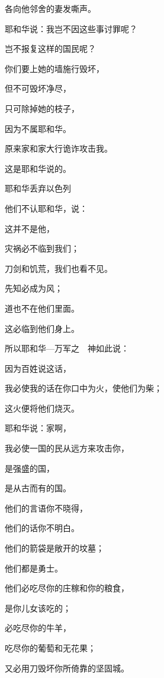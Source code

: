 {\par }{\Q 各向他邻舍的妻发嘶声。
\par }{\Q {}耶和华说：我岂不因这些事讨罪呢？
\par }{\Q 岂不报复这样的国民呢？
\par }{\Q {}你们要上她{}的墙施行毁坏，
\par }{\Q 但不可毁坏净尽，
\par }{\Q 只可除掉她的枝子，
\par }{\Q 因为不属耶和华。
\par }{\Q {}原来{}家和{}家大行诡诈攻击我。
\par }{\Q 这是耶和华说的。
\par }{\SH 耶和华丢弃以色列
\par }{\Q {}他们不认耶和华，说：
\par }{\Q 这并不是他，
\par }{\Q 灾祸必不临到我们；
\par }{\Q 刀剑和饥荒，我们也看不见。
\par }{\Q {}先知{}必成为风；
\par }{\Q 道也不在他们里面。
\par }{\Q 这{}必临到他们身上。
\par }{\BB \par }{\Q {}所以耶和华—万军之　神如此说：
\par }{\Q 因为百姓说这话，
\par }{\Q 我必使我的话在你口中为火，使他们为柴；
\par }{\Q 这火便将他们烧灭。
\par }{\Q {}耶和华说：{}家啊，
\par }{\Q 我必使一国的民从远方来攻击你，
\par }{\Q 是强盛的国，
\par }{\Q 是从古而有的国。
\par }{\Q 他们的言语你不晓得，
\par }{\Q 他们的话你不明白。
\par }{\Q {}他们的箭袋是敞开的坟墓；
\par }{\Q 他们都是勇士。
\par }{\Q {}他们必吃尽你的庄稼和你的粮食，
\par }{\Q 是你儿女该吃的；
\par }{\Q 必吃尽你的牛羊，
\par }{\Q 吃尽你的葡萄和无花果；
\par }{\Q 又必用刀毁坏你所倚靠的坚固城。
}

